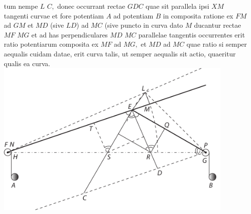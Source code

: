 tum
nempe $L$ $C,$ donec occurrant rectae $GDC$ quae sit parallela ipsi $XM$ tangenti curvae et fore
potentiam $A$ ad potentiam $B$ in composita ratione ex $FM$ ad $GM$ et $MD$ (sive $LD$) ad $MC$ (sive 
 puncto in curva dato $M$ ducantur rectae $MF$ $MG$ et ad has perpendiculares $MD$ $MC$ parallelae tangentis occurrentes erit ratio potentiarum composita ex $MF$ ad $MG,$ et $MD$ ad $MC$ quae ratio si semper aequalis cuidam datae, erit curva talis, ut semper aequalis sit actio, quaeritur qualis ea curva.
\pend
\count{}
\count{}
\count{}
\pstart
\centering
\includegraphics[width=0.88\textwidth]{images/LH037,03_080r-d3.pdf}\\
\pend
\vspace{1.5em}